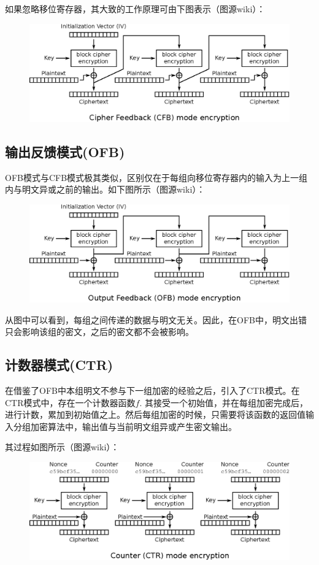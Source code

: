 如果忽略移位寄存器，其大致的工作原理可由下图表示（图源wiki）：
\begin{figure}[H]
\centering
\includegraphics[scale=1]{CFB.eps}
\end{figure}
\subsection{输出反馈模式(OFB)}
OFB模式与CFB模式极其类似，区别仅在于每组向移位寄存器内的输入为上一组内与明文异或之前的输出。如下图所示（图源wiki）：
\begin{figure}[H]
\centering
\includegraphics[scale=1]{OFB.eps}
\end{figure}

从图中可以看到，每组之间传递的数据与明文无关。因此，在OFB中，明文出错只会影响该组的密文，之后的密文都不会被影响。
\subsection{计数器模式(CTR)}
在借鉴了OFB中本组明文不参与下一组加密的经验之后，引入了CTR模式。在CTR模式中，存在一个计数器函数$f$. 其接受一个初始值，并在每组加密完成后，进行计数，累加到初始值之上。然后每组加密的时候，只需要将该函数的返回值输入分组加密算法中，输出值与当前明文组异或产生密文输出。\par
其过程如图所示（图源wiki）：
\begin{figure}[H]
\centering
\includegraphics[scale=1]{CTR.eps}
\end{figure}

